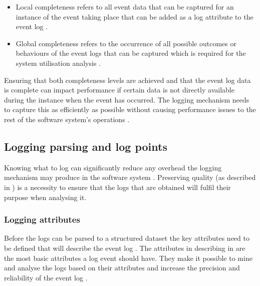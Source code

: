 \begin{itemize}
	\item Local completeness refers to all event data that can be captured for an instance of the event taking place that can be added as a log attribute to the event log \cite{Kherbouche2017, VanDerAalst2004}.
	\item Global completeness refers to the occurrence of all possible outcomes or behaviours of the event logs that can be captured which is required for the system utilisation analysis \cite{Kherbouche2017, VanDerAalst2004}.
\end{itemize}

Ensuring that both completeness levels are achieved and that the event log data is complete can impact performance if certain data is not directly available during the instance when the event has occurred. The logging mechanism needs to capture this as efficiently as possible without causing performance issues to the rest of the software system's operations \cite{Zhu2015, Zhu2019}. 

\subsection{Logging parsing and log points}\label{sec:ch1_loggignPoints}
Knowing what to log can significantly reduce any overhead the logging mechanism may produce in the software system \cite{Jia2018, Pecchia2015}. Preserving quality (as described in ) is a necessity to ensure that the logs that are obtained will fulfil their purpose when analysing it.

\subsubsection{Logging attributes}
Before the logs can be parsed to a structured dataset the key attributes need to be defined that will describe the event log \cite{Bekeneva2020}. The attributes in describing in  are the most basic attributes a log event should have. They make it possible to mine and analyse the logs based on their attributes and increase the precision and reliability of the event log \cite{Kherbouche2017}.

